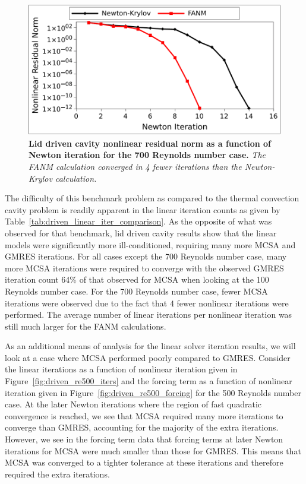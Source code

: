 \begin{figure}[t!]
  \begin{center}
    \includegraphics[width=6in]{chapters/nonlinear_problem/re700_convergence.pdf}
  \end{center}
  \caption{\textbf{Lid driven cavity nonlinear residual norm as a
      function of Newton iteration for the 700 Reynolds number case.}
    \textit{The FANM calculation converged in 4 fewer iterations than
      the Newton-Krylov calculation.}}
  \label{fig:re700_convergence}
\end{figure}

The difficulty of this benchmark problem as compared to the thermal
convection cavity problem is readily apparent in the linear iteration
counts as given by Table~\ref{tab:driven_linear_iter_comparison}. As
the opposite of what was observed for that benchmark, lid driven
cavity results show that the linear models were significantly more
ill-conditioned, requiring many more MCSA and GMRES iterations. For
all cases except the 700 Reynolds number case, many more MCSA
iterations were required to converge with the observed GMRES iteration
count 64\% of that observed for MCSA when looking at the 100 Reynolds
number case. For the 700 Reynolds number case, fewer MCSA iterations
were observed due to the fact that 4 fewer nonlinear iterations were
performed. The average number of linear iterations per nonlinear
iteration was still much larger for the FANM calculations.

As an additional means of analysis for the linear solver iteration
results, we will look at a case where MCSA performed poorly compared
to GMRES. Consider the linear iterations as a function of nonlinear
iteration given in Figure~\ref{fig:driven_re500_iters} and the forcing
term as a function of nonlinear iteration given in
Figure~\ref{fig:driven_re500_forcing} for the 500 Reynolds number
case. At the later Newton iterations where the region of fast
quadratic convergence is reached, we see that MCSA required many more
iterations to converge than GMRES, accounting for the majority of the
extra iterations. However, we see in the forcing term data that
forcing terms at later Newton iterations for MCSA were much smaller
than those for GMRES. This means that MCSA was converged to a tighter
tolerance at these iterations and therefore required the extra
iterations.

